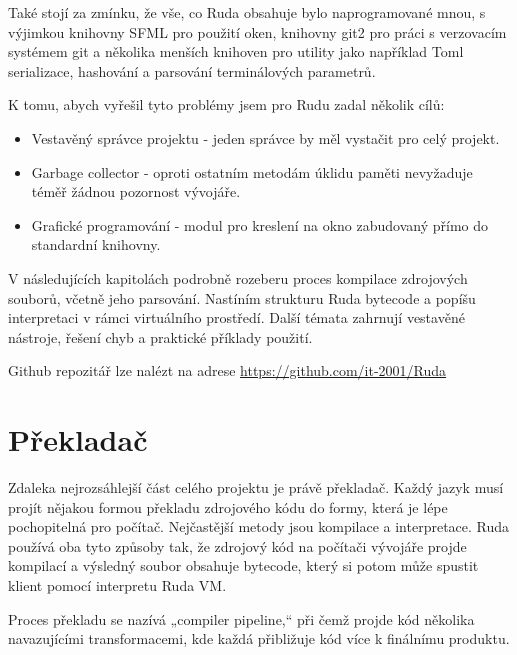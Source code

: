 \documentclass[12pt, a4paper,
twoside,        %
openright
]{report}
\let\oldchapter\chapter
\renewcommand{\chapter}{
	\clearpage
	\pagestyle{fancy}
	\oldchapter
}
\begin{document}
	Také stojí za zmínku, že vše, co Ruda obsahuje bylo naprogramované mnou, s výjimkou knihovny SFML pro použití oken, knihovny git2 pro práci s verzovacím systémem git a několika menších knihoven pro utility jako například Toml serializace, hashování a parsování terminálových parametrů.
	
	\noindent
	K tomu, abych vyřešil tyto problémy jsem pro Rudu zadal několik cílů:
	\begin{itemize}
		\item Vestavěný správce projektu - jeden správce by měl vystačit pro celý projekt.
		\item Garbage collector - oproti ostatním metodám úklidu paměti nevyžaduje téměř žádnou pozornost vývojáře.
		\item Grafické programování - modul pro kreslení na okno zabudovaný přímo do standardní knihovny.
	\end{itemize}
	
	\noindent 
	V následujících kapitolách podrobně rozeberu proces kompilace zdrojových souborů, včetně jeho parsování. Nastíním strukturu Ruda bytecode a popíšu interpretaci v rámci virtuálního prostředí. Další témata zahrnují vestavěné nástroje, řešení chyb a praktické příklady použití.
	
	Github repozitář lze nalézt na adrese \url{https://github.com/it-2001/Ruda}
	
	
	
	\chapter{Překladač}
	
	Zdaleka nejrozsáhlejší část celého projektu je právě překladač. Každý jazyk musí projít nějakou formou překladu zdrojového kódu do formy, která je lépe pochopitelná pro počítač. Nejčastější metody jsou kompilace a interpretace. Ruda používá oba tyto způsoby tak, že zdrojový kód na počítači vývojáře projde kompilací a výsledný soubor obsahuje bytecode, který si potom může spustit klient pomocí interpretu Ruda VM.
	
	Proces překladu se nazívá „compiler pipeline,“ při čemž projde kód několika navazujícími transformacemi, kde každá přibližuje kód více k finálnímu produktu.
	
\end{document}
